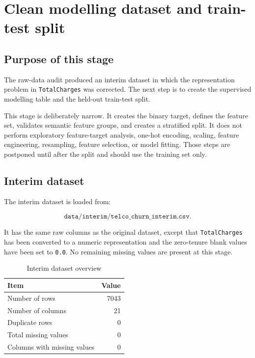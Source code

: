 \section{Clean modelling dataset and train-test split}

\subsection{Purpose of this stage}

The raw-data audit produced an interim dataset in which the representation problem in \texttt{TotalCharges} was corrected. The next step is to create the supervised modelling table and the held-out train-test split.

This stage is deliberately narrow. It creates the binary target, defines the feature set, validates semantic feature groups, and creates a stratified split. It does not perform exploratory feature-target analysis, one-hot encoding, scaling, feature engineering, resampling, feature selection, or model fitting. Those steps are postponed until after the split and should use the training set only.

\subsection{Interim dataset}

The interim dataset is loaded from:

\[
\texttt{data/interim/telco\_churn\_interim.csv}.
\]

It has the same raw columns as the original dataset, except that \texttt{TotalCharges} has been converted to a numeric representation and the zero-tenure blank values have been set to \texttt{0.0}. No remaining missing values are present at this stage.

\begin{table}[H]
\centering
\caption{Interim dataset overview}
\begin{tabular}{lr}
\toprule
Item & Value \\
\midrule
Number of rows & 7043 \\
Number of columns & 21 \\
Duplicate rows & 0 \\
Total missing values & 0 \\
Columns with missing values & 0 \\
\bottomrule
\end{tabular}
\end{table}

